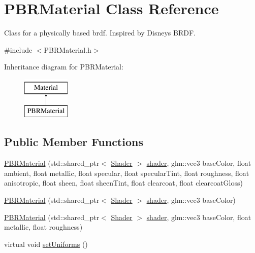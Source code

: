 \hypertarget{class_p_b_r_material}{}\section{P\+B\+R\+Material Class Reference}
\label{class_p_b_r_material}


Class for a physically based brdf. Inspired by Disney\textquotesingle{}s B\+R\+DF.  




{\ttfamily \#include $<$P\+B\+R\+Material.\+h$>$}

Inheritance diagram for P\+B\+R\+Material\+:\begin{figure}[H]
\begin{center}
\leavevmode
\includegraphics[height=2.000000cm]{class_p_b_r_material}
\end{center}
\end{figure}
\subsection*{Public Member Functions}
\begin{DoxyCompactItemize}
\item 
\mbox{\hyperlink{class_p_b_r_material_a7d68d63ef74715518d63041336b2a684}{P\+B\+R\+Material}} (std\+::shared\+\_\+ptr$<$ \mbox{\hyperlink{class_shader}{Shader}} $>$ \mbox{\hyperlink{class_material_a2528e7055a949798de91d54c259faf1e}{shader}}, glm\+::vec3 base\+Color, float ambient, float metallic, float specular, float specular\+Tint, float roughness, float anisotropic, float sheen, float sheen\+Tint, float clearcoat, float clearcoat\+Gloss)
\item 
\mbox{\hyperlink{class_p_b_r_material_ac100af6df5a64a4c64a948669b9b66be}{P\+B\+R\+Material}} (std\+::shared\+\_\+ptr$<$ \mbox{\hyperlink{class_shader}{Shader}} $>$ \mbox{\hyperlink{class_material_a2528e7055a949798de91d54c259faf1e}{shader}}, glm\+::vec3 base\+Color)
\item 
\mbox{\hyperlink{class_p_b_r_material_a153da8222f39498c6749a2c7d2c20e21}{P\+B\+R\+Material}} (std\+::shared\+\_\+ptr$<$ \mbox{\hyperlink{class_shader}{Shader}} $>$ \mbox{\hyperlink{class_material_a2528e7055a949798de91d54c259faf1e}{shader}}, glm\+::vec3 base\+Color, float metallic, float roughness)
\item 
virtual void \mbox{\hyperlink{class_p_b_r_material_ae8cabaa3a19fc6787233f2f06b1d058e}{set\+Uniforms}} ()
\end{DoxyCompactItemize}
